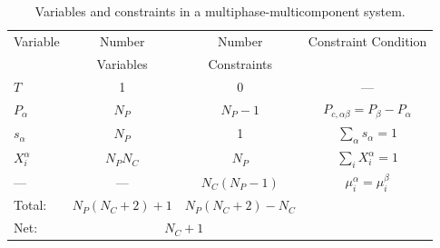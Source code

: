 \documentclass[12pt]{article}
\renewcommand{\a}{{\alpha}}
\renewcommand{\b}{{\beta}}
\begin{document}
\begin{table}[h]\centering
\caption{Variables and constraints in a multiphase-multicomponent system.}
\label{tdof}

\vspace{3mm}
\renewcommand{\arraystretch}{1.25}
\begin{tabular}{lccc}
\toprule
Variable & Number & Number & Constraint Condition\\
&Variables&Constraints&\\
\midrule
$T$ & 1 & 0 & ---\\
$P_\a$ & $N_P$ & $N_P\!-\!1$ & $P_{c,\a\b} = P_\b - P_\a$\\
$s_\a$ & $N_P$ & 1 & $\sum_\a s_\a=1$\\
$X_i^\a$ & $N_P N_C$ & $N_P$ & $\sum_i X_i^\a=1$\\
---&---& $N_C(N_P\!-\!1)$ & $\mu_i^\a = \mu_i^\b$\\
\midrule
Total: & $N_P(N_C+2)+1$ & $N_P (N_C + 2)-N_C$\\
\midrule
Net: & \multicolumn{2}{c}{$N_C+1$}\\
\bottomrule
\end{tabular}
\end{table}
\end{document}

